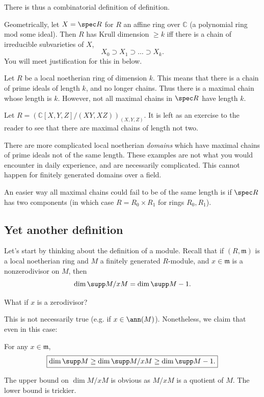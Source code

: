 There is thus a combinatorial definition of definition.

Geometrically, let $X = \spec R$ for $R$ an affine ring over $\mathbb{C}$ (a
polynomial ring mod some ideal). Then $R$ has Krull dimension $\geq k$ iff there is a
chain of irreducible subvarieties of $X$,
\[ X_0 \supset X_1 \supset \dots \supset X_k . \]
You will meet justification for this in  below.

\begin{remark} Let $R$ be a local noetherian ring of dimension $k$. This
means that there is a chain of prime ideals of length $k$, and no longer
chains. Thus there is a maximal chain whose length is $k$. However, not all
maximal chains in $\spec R$ have length $k$. 
\end{remark} 

\begin{example} 
Let $R =( \mathbb{C}[X,Y,Z]/(XY,XZ))_{(X,Y,Z)}$. It is left as an
exercise to the reader to see that there are maximal chains of
length not two.

There are more complicated local noetherian \emph{domains} which have maximal
chains of prime ideals not of the same length. These examples are not what you
would encounter in daily experience, and are necessarily complicated. This
cannot happen for finitely generated domains over a field.
\end{example} 

\begin{example} 
An easier way all maximal chains could fail to be of the same length is if
$\spec R$ has two components (in which case $R = R_0 \times R_1$ for rings
$R_0, R_1$). 
\end{example} 


\subsection{Yet another definition}
Let's start by thinking about the definition of a module. Recall that if $(R,
\mathfrak{m})$ is
a local noetherian ring and $M$ a finitely generated $R$-module, and $x \in \mathfrak{m}$ is
a nonzerodivisor on $M$, then
\[ \dim \supp M/xM = \dim \supp M -1.  \]

\begin{question} 
What if $x$ is  a zerodivisor? 
\end{question} 

This is not necessarily true (e.g. if $x \in \ann(M)$). Nonetheless, we claim
that even in this case:
\begin{proposition} 
For any $x \in \mathfrak{m}$,
\[ \boxed{ \dim \supp M \geq \dim \supp M/xM \geq \dim \supp M -1 .}\]
\end{proposition} 
The upper bound on $\dim M/xM$ is obvious as $M/xM$ is a quotient of $M$. The
lower bound is trickier. 

